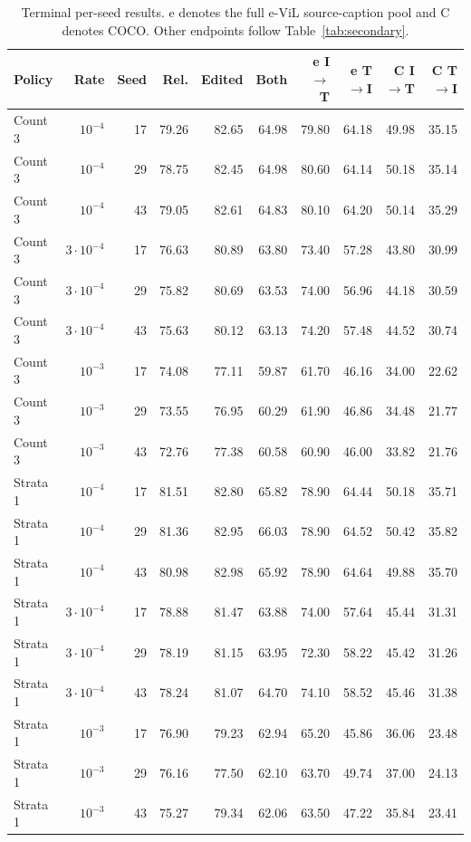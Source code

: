 \begin{table}[t]
\nolinenumbers
\centering
\small
\setlength{\tabcolsep}{3pt}
\begin{tabular}{lrrrrrrrrr}
\toprule
Policy & Rate & Seed & Rel. & Edited & Both & e I$\to$T & e T$\to$I & C I$\to$T & C T$\to$I\\
\midrule
Count 3 & $10^{-4}$ & 17 & 79.26 & 82.65 & 64.98 & 79.80 & 64.18 & 49.98 & 35.15\\
Count 3 & $10^{-4}$ & 29 & 78.75 & 82.45 & 64.98 & 80.60 & 64.14 & 50.18 & 35.14\\
Count 3 & $10^{-4}$ & 43 & 79.05 & 82.61 & 64.83 & 80.10 & 64.20 & 50.14 & 35.29\\
Count 3 & $3\cdot10^{-4}$ & 17 & 76.63 & 80.89 & 63.80 & 73.40 & 57.28 & 43.80 & 30.99\\
Count 3 & $3\cdot10^{-4}$ & 29 & 75.82 & 80.69 & 63.53 & 74.00 & 56.96 & 44.18 & 30.59\\
Count 3 & $3\cdot10^{-4}$ & 43 & 75.63 & 80.12 & 63.13 & 74.20 & 57.48 & 44.52 & 30.74\\
Count 3 & $10^{-3}$ & 17 & 74.08 & 77.11 & 59.87 & 61.70 & 46.16 & 34.00 & 22.62\\
Count 3 & $10^{-3}$ & 29 & 73.55 & 76.95 & 60.29 & 61.90 & 46.86 & 34.48 & 21.77\\
Count 3 & $10^{-3}$ & 43 & 72.76 & 77.38 & 60.58 & 60.90 & 46.00 & 33.82 & 21.76\\
Strata 1 & $10^{-4}$ & 17 & 81.51 & 82.80 & 65.82 & 78.90 & 64.44 & 50.18 & 35.71\\
Strata 1 & $10^{-4}$ & 29 & 81.36 & 82.95 & 66.03 & 78.90 & 64.52 & 50.42 & 35.82\\
Strata 1 & $10^{-4}$ & 43 & 80.98 & 82.98 & 65.92 & 78.90 & 64.64 & 49.88 & 35.70\\
Strata 1 & $3\cdot10^{-4}$ & 17 & 78.88 & 81.47 & 63.88 & 74.00 & 57.64 & 45.44 & 31.31\\
Strata 1 & $3\cdot10^{-4}$ & 29 & 78.19 & 81.15 & 63.95 & 72.30 & 58.22 & 45.42 & 31.26\\
Strata 1 & $3\cdot10^{-4}$ & 43 & 78.24 & 81.07 & 64.70 & 74.10 & 58.52 & 45.46 & 31.38\\
Strata 1 & $10^{-3}$ & 17 & 76.90 & 79.23 & 62.94 & 65.20 & 45.86 & 36.06 & 23.48\\
Strata 1 & $10^{-3}$ & 29 & 76.16 & 77.50 & 62.10 & 63.70 & 49.74 & 37.00 & 24.13\\
Strata 1 & $10^{-3}$ & 43 & 75.27 & 79.34 & 62.06 & 63.50 & 47.22 & 35.84 & 23.41\\
\bottomrule
\end{tabular}
\caption{Terminal per-seed results. e denotes the full e-ViL source-caption pool and C denotes COCO. Other endpoints follow Table~\ref{tab:secondary}.}\label{tab:futerm2}
\end{table}
